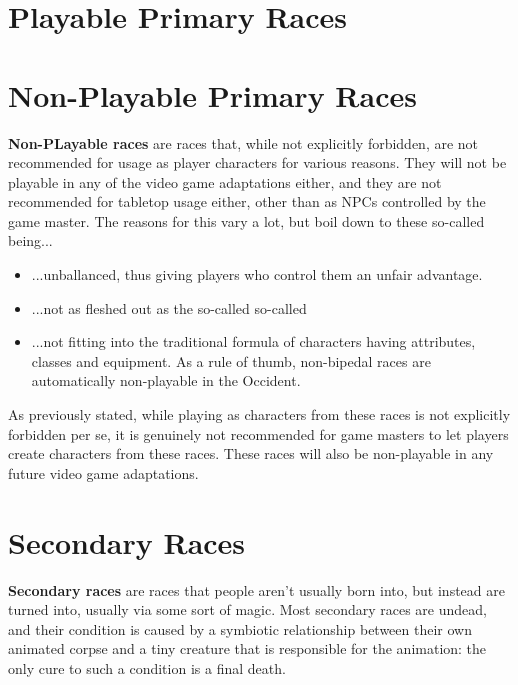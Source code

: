 \chapter{Playable Primary Races}
 
 
 
 
 
 
 
 
 
 
 
 
 
 \chapter{Non-Playable Primary Races}
 \textbf{Non-PLayable races} are races that, while not explicitly forbidden, are not recommended for usage as player characters for various reasons. They will not be playable in any of the video game adaptations either, and they are not recommended for tabletop usage either, other than as NPCs controlled by the game master. The reasons for this vary a lot, but boil down to these so-called  being...
 \begin{itemize}
 	\item ...unballanced, thus giving players who control them an unfair advantage.
 	\item ...not as fleshed out as the so-called so-called 
 	\item ...not fitting into the traditional formula of characters having attributes, classes and equipment. As a rule of thumb, non-bipedal races are automatically non-playable in the Occident.
 \end{itemize}
 As previously stated, while playing as characters from these races is not explicitly forbidden per se, it is genuinely not recommended for game masters to let players create characters from these races. These races will also be non-playable in any future video game adaptations.
 
 
 
 
 
 \chapter{Secondary Races}
 \textbf{Secondary races} are races that people aren't usually born into, but instead are turned into, usually via some sort of magic. Most secondary races are undead, and their condition is caused by a symbiotic relationship between their own animated corpse and a tiny creature that is responsible for the animation: the only cure to such a condition is a final death.
 
 
 
